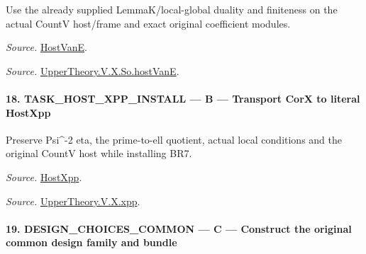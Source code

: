 Use the already supplied LemmaK/local-global duality and finiteness on the actual CountV host/frame and exact original coefficient modules.

\emph{Source.} \href{https://github.com/CocoSgt/riemann-hypothesis-lean/blob/7cbf7a0c32fca1badf05931879a37c3f8a2b03b4/src/Development/AutomorphicArithmetic/AutomorphicVarieties/UnitaryThreeDeformations/HostNumber.lean#L9-L12}{HostVanE}.

\emph{Source.} \href{https://github.com/CocoSgt/riemann-hypothesis-lean/blob/7cbf7a0c32fca1badf05931879a37c3f8a2b03b4/src/Development/AutomorphicArithmetic/AutomorphicVarieties/LevelCohomology/SoHostVanE.lean#L11-L18}{UpperTheory.V.X.So.hostVanE}.



\paragraph{18. TASK\_\allowbreak HOST\_\allowbreak XPP\_\allowbreak INSTALL — B — Transport CorX to literal HostXpp}

Preserve Psi\textasciicircum{}-2 eta, the prime-to-ell quotient, actual local conditions and the original CountV host while installing BR7.

\emph{Source.} \href{https://github.com/CocoSgt/riemann-hypothesis-lean/blob/7cbf7a0c32fca1badf05931879a37c3f8a2b03b4/src/Development/AutomorphicArithmetic/AutomorphicVarieties/UnitaryThreeDeformations/HostNumber.lean#L14-L17}{HostXpp}.

\emph{Source.} \href{https://github.com/CocoSgt/riemann-hypothesis-lean/blob/7cbf7a0c32fca1badf05931879a37c3f8a2b03b4/src/Development/AutomorphicArithmetic/AutomorphicVarieties/LevelCohomology/Xpp.lean#L11-L84}{UpperTheory.V.X.xpp}.



\paragraph{19. DESIGN\_\allowbreak CHOICES\_\allowbreak COMMON — C — Construct the original common design family and bundle}

